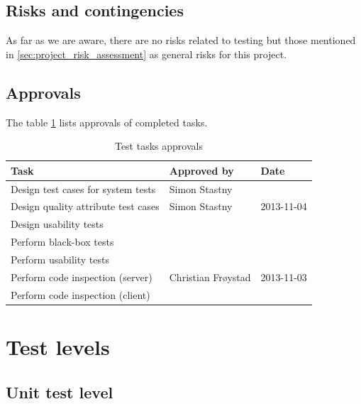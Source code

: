 \documentclass[11pt]{book}
\begin{document}
\subsection{Risks and contingencies}

As far as we are aware, there are no risks related to testing but those mentioned in \ref{sec:project_risk_assessment} as general risks for this project.

\subsection{Approvals}

The table \ref{tab:test_plan_approvals} lists approvals of completed tasks.

\begin{table}[H]
    \centering
    \begin{tabular}{| l | l | l |}
        \hline
        Task                                & Approved by             & Date           \\ \hline
        Design test cases for system tests  & Simon Stastny           &                \\ \hline
        Design quality attribute test cases & Simon Stastny           & 2013-11-04     \\ \hline
        Design usability tests              &                         &                \\ \hline
        Perform black-box tests             &                         &                \\ \hline
        Perform usability tests             &                         &                \\ \hline
        Perform code inspection (server)    & Christian Frøystad      & 2013-11-03     \\ \hline
        Perform code inspection (client)    &                         &                \\ \hline
    \end{tabular}
    \caption{Test tasks approvals}
    \label{tab:test_plan_approvals}
\end{table}


\section{Test levels}

\subsection{Unit test level}
\end{document}
